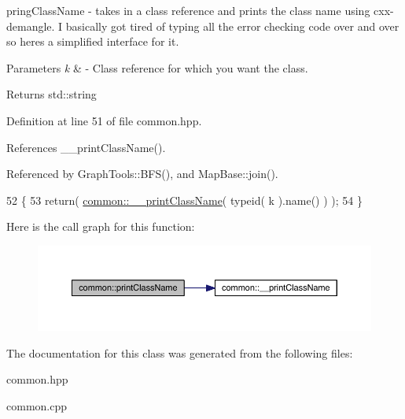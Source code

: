 pring\+Class\+Name -\/ takes in a class reference and prints the class name using cxx-\/demangle. I basically got tired of typing all the error checking code over and over so here\textquotesingle{}s a simplified interface for it. 
\begin{DoxyParams}{Parameters}
{\em k} & -\/ Class reference for which you want the class. \\
\hline
\end{DoxyParams}
\begin{DoxyReturn}{Returns}
std\+::string 
\end{DoxyReturn}


Definition at line 51 of file common.\+hpp.



References \+\_\+\+\_\+print\+Class\+Name().



Referenced by Graph\+Tools\+::\+B\+F\+S(), and Map\+Base\+::join().


\begin{DoxyCode}
52 \{
53    \textcolor{keywordflow}{return}( \hyperlink{classcommon_a7ca2338596041e14a38de0f63d1c1e31}{common::\_\_printClassName}( \textcolor{keyword}{typeid}( k ).name() ) );
54 \}
\end{DoxyCode}
Here is the call graph for this function\+:
\nopagebreak
\begin{figure}[H]
\begin{center}
\leavevmode
\includegraphics[width=350pt]{classcommon_aec4b942352abd180c71fca2c0dbd70b7_cgraph}
\end{center}
\end{figure}


The documentation for this class was generated from the following files\+:\begin{DoxyCompactItemize}
\item 
common.\+hpp\item 
common.\+cpp\end{DoxyCompactItemize}
